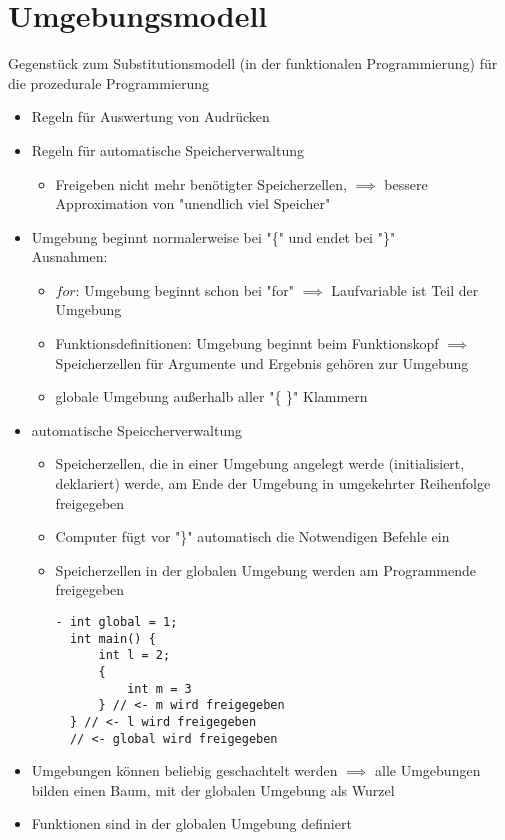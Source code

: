 \documentclass[a4paper]{scrartcl}
\begin{document}
\section{Umgebungsmodell}
\label{sec-9}
Gegenstück zum Substitutionsmodell (in der funktionalen Programmierung) für die prozedurale Programmierung
\begin{itemize}
\item Regeln für Auswertung von Audrücken
\item Regeln für automatische Speicherverwaltung
\begin{itemize}
\item Freigeben nicht mehr benötigter Speicherzellen, $\implies$ bessere Approximation von "unendlich viel Speicher"
\end{itemize}
\item Umgebung beginnt normalerweise bei "\{" und endet bei "\}" \\
    Ausnahmen:
\begin{itemize}
\item $for$: Umgebung beginnt schon bei "for" $\implies$ Laufvariable ist Teil der Umgebung
\item Funktionsdefinitionen: Umgebung beginnt beim Funktionskopf $\implies$ Speicherzellen für Argumente und Ergebnis gehören zur Umgebung
\item globale Umgebung außerhalb aller "\{ \}" Klammern
\end{itemize}
\item automatische Speiccherverwaltung
\begin{itemize}
\item Speicherzellen, die in einer Umgebung angelegt werde (initialisiert, deklariert) werde, am Ende der Umgebung in umgekehrter Reihenfolge freigegeben
\item Computer fügt vor "\}" automatisch die Notwendigen Befehle ein
\item Speicherzellen in der globalen Umgebung werden am Programmende freigegeben
\begin{verbatim}
- int global = 1;
  int main() {
	  int l = 2;
	  {
		  int m = 3
	  } // <- m wird freigegeben
  } // <- l wird freigegeben
  // <- global wird freigegeben
\end{verbatim}
\end{itemize}
\item Umgebungen können beliebig geschachtelt werden $\implies$ alle Umgebungen bilden einen Baum, mit der globalen Umgebung als Wurzel
\item Funktionen sind in der globalen Umgebung definiert

\end{itemize}
\end{document}

